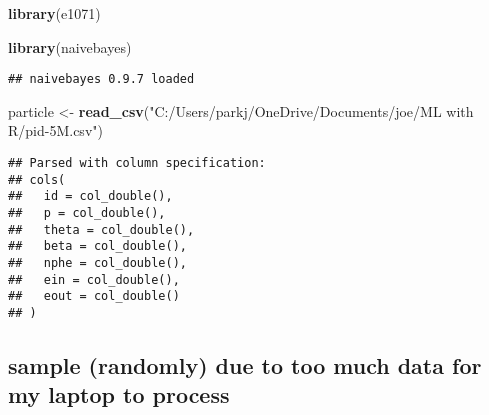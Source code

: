 \documentclass[
]{article}
\newenvironment{Shaded}{\begin{snugshade}}{\end{snugshade}}
\newcommand{\CommentTok}[1]{\textcolor[rgb]{0.56,0.35,0.01}{\textit{#1}}}
\newcommand{\DecValTok}[1]{\textcolor[rgb]{0.00,0.00,0.81}{#1}}
\newcommand{\KeywordTok}[1]{\textcolor[rgb]{0.13,0.29,0.53}{\textbf{#1}}}
\newcommand{\NormalTok}[1]{#1}
\newcommand{\OperatorTok}[1]{\textcolor[rgb]{0.81,0.36,0.00}{\textbf{#1}}}
\newcommand{\StringTok}[1]{\textcolor[rgb]{0.31,0.60,0.02}{#1}}
\begin{document}
\begin{Shaded}
\begin{Highlighting}[]
\KeywordTok{library}\NormalTok{(e1071)}

\KeywordTok{library}\NormalTok{(naivebayes)}
\end{Highlighting}
\end{Shaded}

\begin{verbatim}
## naivebayes 0.9.7 loaded
\end{verbatim}

\begin{Shaded}
\begin{Highlighting}[]
\NormalTok{particle <-}\StringTok{ }\KeywordTok{read_csv}\NormalTok{(}\StringTok{"C:/Users/parkj/OneDrive/Documents/joe/ML with R/pid-5M.csv"}\NormalTok{)}
\end{Highlighting}
\end{Shaded}

\begin{verbatim}
## Parsed with column specification:
## cols(
##   id = col_double(),
##   p = col_double(),
##   theta = col_double(),
##   beta = col_double(),
##   nphe = col_double(),
##   ein = col_double(),
##   eout = col_double()
## )
\end{verbatim}

\hypertarget{sample-randomly-due-to-too-much-data-for-my-laptop-to-process}{%
\subsection{sample (randomly) due to too much data for my laptop to
process}\label{sample-randomly-due-to-too-much-data-for-my-laptop-to-process}}

\begin{Shaded}
\end{Shaded}
\end{document}
